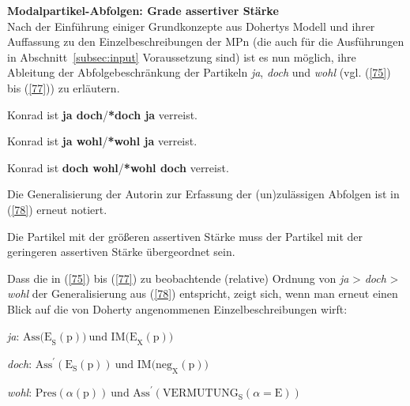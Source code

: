\noindent
\textbf{Modalpartikel-Abfolgen: Grade assertiver Stärke}\\
Nach der Einführung einiger Grundkonzepte aus Dohertys Modell und ihrer Auffassung zu den Einzelbeschreibungen der MPn (die auch für die Ausführungen in Abschnitt~\ref{subsec:input} Voraussetzung sind) ist es nun möglich, ihre Ableitung der Abfolgebeschränkung der Partikeln \textit{ja}, \textit{doch} und \textit{wohl} (vgl. (\ref{75}) bis (\ref{77})) zu erläutern.

\begin{exe}
	\ex\label{75} 
	Konrad ist \textbf{ja doch}/\textbf{*doch ja} verreist.		
\end{exe}
\vspace{-0.65cm}
\begin{exe}
	\ex\label{76} 
	Konrad ist \textbf{ja wohl}/\textbf{*wohl ja} verreist.	
\end{exe}
\vspace{-0.65cm}
\begin{exe}
	\ex\label{77} 
	Konrad ist \textbf{doch wohl}/\textbf{*wohl doch} verreist.
	\hfill\hbox {\citet[83]{Doherty1985}}
\end{exe}
Die Generalisierung der Autorin zur Erfassung der (un)zulässigen Abfolgen ist in (\ref{78}) erneut notiert.

\begin{exe}
	\ex\label{78} 
	Die Partikel mit der größeren assertiven Stärke muss der Partikel mit der geringeren assertiven Stärke übergeordnet sein.	
	\hfill\hbox {\citet[83]{Doherty1985}}
\end{exe}
Dass die in (\ref{75}) bis (\ref{77}) zu beobachtende (relative) Ordnung von \textit{ja} > \textit{doch} > \textit{wohl} der Generalisierung aus (\ref{78}) entspricht, zeigt sich, wenn man erneut einen Blick auf die von Doherty angenommenen Einzelbeschreibungen wirft:

\begin{exe}
	\ex\label{79} 
	\textit{ja}: $\textrm{Ass(E}_{\textrm{S}}(\textrm{p})) \ \textrm{und IM(E}_{\textrm{X}}(\textrm{p}))$
\end{exe}
\vspace{-0.65cm}	
\begin{exe}
	\ex\label{80} 
	\textit{doch}: $\textrm{Ass}^{\prime}(\textrm{E}_{\textrm{S}}(\textrm{p})) \  \textrm{und IM(neg}_{\textrm{X}}(\textrm{p}))$
\end{exe}	
\vspace{-0.65cm}	
\begin{exe}
	\ex\label{81} 
	\textit{wohl}: $\textrm{Pres}(\alpha(\textrm{p})) \  \textrm{und Ass}^{\prime}(\textrm{VERMUTUNG}_{\textrm{S}}(\alpha=\textrm{E}))$
\end{exe}	

